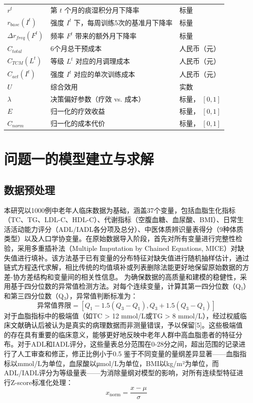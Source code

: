 \documentclass[12pt,a4paper]{ctexart}
\begin{document}
\begin{table}[h]
\begin{tabular}{p{2.5cm}p{7.5cm}p{4cm}}
$r^t$ & 第 $t$ 个月的痰湿积分月下降率 & 标量 \\
$r_{base}(I^t)$ & 强度 $I^t$ 下，每周训练5次的基准月下降率 & 标量 \\
$\Delta r_{freq}(F^t)$ & 频率 $F^t$ 带来的额外月下降率 & 标量 \\
$C_{total}$ & 6个月总干预成本 & 人民币（元） \\
$C_{TCM}(L^t)$ & 等级 $L^t$ 对应的月调理成本 & 人民币（元） \\
$C_{act}(I^t)$ & 强度 $I^t$ 对应的单次训练成本 & 人民币（元） \\
$U$ & 综合效用 & 实数 \\
$\lambda$ & 决策偏好参数（疗效 vs. 成本） & 标量， $[0, 1]$ \\
$E$ & 归一化的疗效收益 & 标量， $[0, 1]$ \\
$C_{norm}$ & 归一化的成本代价 & 标量， $[0, 1]$ \\
\bottomrule
\end{tabular}
\end{table}

\section{问题一的模型建立与求解}
\subsection{数据预处理}
本研究以1000例中老年人临床数据为基础，涵盖37个变量，包括血脂生化指标（TC、TG、LDL-C、HDL-C）、代谢指标（空腹血糖、血尿酸、BMI）、日常生活活动能力评分（ADL/IADL各分项及总分）、中医体质辨识量表得分（9种体质类型）以及人口学协变量。在原始数据导入阶段，首先对所有变量进行完整性检验，采用多重插补法（Multiple Imputation by Chained Equations, MICE）对缺失值进行填补。该方法基于已有变量的分布特征对缺失值进行随机抽样估计，通过链式方程迭代求解，相比传统的均值填补或列表删除法能更好地保留原始数据的方差-协方差结构和变量间的相关性信息。
为确保数据的高质量和建模的稳健性，采用基于四分位数的异常值检测方法。对每个连续变量，计算其第一四分位数（Q₁）和第三四分位数（Q₃），异常值判断标准为：
\begin{equation}
\text{异常值界限} = [Q_1 - 1.5(Q_3 - Q_1), Q_3 + 1.5(Q_3 - Q_1)]
\label{异常值界限}
\end{equation}
对于血脂指标中的极端值（如TC > 12 mmol/L或TG > 8 mmol/L），经过权威临床文献确认后被认为是真实的病理数据而非测量错误，予以保留[5]。这些极端值的存在具有重要的临床意义，能够更好地反映中老年人群中高血脂患者的特征分布。对于ADL和IADL评分，这些量表总分范围在0-28分之间，超出范围的记录进行了人工审查和修正，修正比例小于0.5%
鉴于不同变量的量纲差异显著——血脂指标以mmol/L为单位，血尿酸以μmol/L为单位，BMI以kg/m²为单位，而ADL/IADL评分为等级量表——为消除量纲对模型的影响，对所有连续型特征进行Z-score标准化处理：
\begin{equation}
    x_{\text{norm}} = \frac{x - \mu}{\sigma}
    \label{eq:zscore}
\end{equation}
\end{document}
